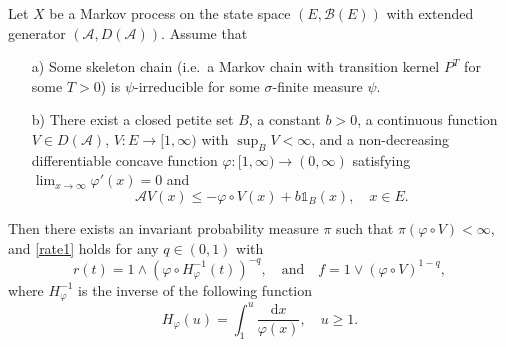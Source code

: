 \documentclass{aptpub}
\newcommand\I{\mathds 1}
\newcommand\dup{\mathrm{d}}
\numberwithin{equation}{section}
\begin{document}
\begin{prop}\label{drift}
    Let $X$ be a Markov process on the state space $(E,\mathscr{B}(E))$ with extended generator $(\mathscr{A},D(\mathscr{A}))$. Assume that
    \begin{enumerate}
        \item[\upshape a)]
             Some skeleton chain {\upshape(}i.e.\ a Markov chain
             with transition kernel $P^T$ for
             some $T>0${\upshape)} is $\psi$-irreducible
             for some $\sigma$-finite measure $\psi$.
        \item[\upshape b)]
            There exist a closed petite set $B$, a constant $b>0$, a continuous function $V\in D(\mathscr{A})$, $V: E\to[1, \infty)$ with $\sup_B V<\infty$, and a non-decreasing differentiable concave function $\varphi:[1, \infty)\to(0, \infty)$ satisfying $\lim_{x\to\infty}\varphi'(x)=0$ and
            \begin{equation}\label{driftineq}
                \mathscr{A} V(x)
                \leq-\varphi\circ V(x)+b\I_B(x),\quad x\in E.
            \end{equation}
    \end{enumerate}
    Then there exists an invariant probability measure $\pi$ such that $\pi(\varphi\circ V)<\infty$, and \eqref{rate1} holds for any $q\in(0,1)$ with
    $$
        r(t)
        = 1 \wedge \left(\varphi\circ H_{\varphi}^{-1}(t) \right)^{-q},
        \quad\text{and}\quad
        f= 1 \vee (\varphi\circ V)^{1-q},
    $$
    where $H_\varphi^{-1}$ is the inverse of the following function
    $$
        H_\varphi(u)
        = \int_1^u\frac{\dup x}{\varphi(x)},
        \quad u\geq 1.
    $$
\end{prop}
\end{document}
